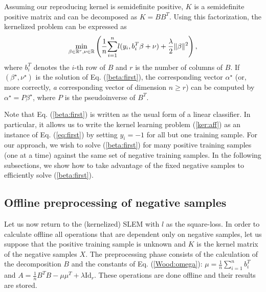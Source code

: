 


Assuming our reproducing kernel is semidefinite positive, 
$K$ is a semidefinite positive matrix and can be decomposed as $K=BB^T$.
Using this factorization, the kernelized problem can be expressed as 
\begin{equation}
\min_{\beta\in\mathbb R^r,\nu\in\mathbb R} \left( \dfrac{1}{n}\displaystyle{\sum_{i=1}^n} l(y_i, b_i^T\beta+\nu)+\dfrac{\lambda}{2}\|\beta\|^2\right), \label{beta:first}
\end{equation}
where $b_i^T$ denotes the $i$-th row of $B$ and $r$ is the number of columns of $B$. 
If $(\beta^\star, \nu^\star)$ is the solution of Eq. (\ref{beta:first}), the corresponding vector $\alpha^\star$ (or, more correctly, \textit{a} corresponding vector of dimension $n\geq r$) 
can be computed by $\alpha^\star=P\beta^\star$, where $P$ is the pseudoinverse of $B^T$.

Note that Eq. (\ref{beta:first}) is written as the usual form of a linear classifier. In particular, it allows us to write the kernel learning problem (\ref{ker:aff}) as an instance of Eq. (\ref{eq:first}) by setting $y_i=-1$ for all but one training sample. For our approach, we wish to solve (\ref{beta:first}) for many positive training samples (one at a time) against the same set of negative training samples. In the following subsections, we show how to take advantage of the fixed negative samples to efficiently solve (\ref{beta:first}).

\subsection{Offline preprocessing of negative samples}\label{offline}
Let us now return to the (kernelized) SLEM with $l$ as the square-loss.
In order to calculate offline all operations that are dependent only on negative samples, let us suppose that the positive training sample is unknown and $K$ is the kernel matrix of the negative samples $X$.
The preprocessing phase consists of the calculation of the decomposition $B$ and the constants of Eq. (\ref{Wood:omega}): $\mu = \frac{1}{n}\sum_{i=1}^n b_i^T$ and $A = \frac{1}{n}B^TB-\mu\mu^T +\lambda\mathrm{Id}_r.$
These operations are done offline and their results are stored. 


